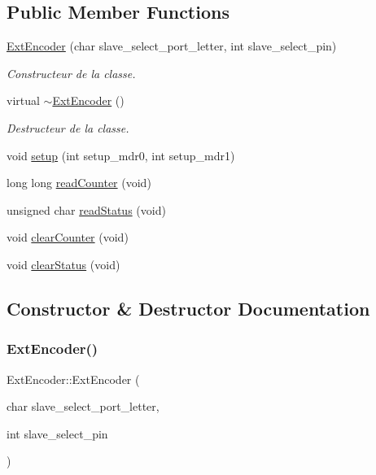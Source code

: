 \subsection*{Public Member Functions}
\begin{DoxyCompactItemize}
\item 
\hyperlink{classExtEncoder_afed10e9b123ac4ce2476cd5cbb7348b1}{Ext\+Encoder} (char slave\+\_\+select\+\_\+port\+\_\+letter, int slave\+\_\+select\+\_\+pin)
\begin{DoxyCompactList}\small\item\em Constructeur de la classe. \end{DoxyCompactList}\item 
\mbox{\label{classExtEncoder_a50afe81cb3a17a6e1caac3170a9ac794}} 
virtual \hyperlink{classExtEncoder_a50afe81cb3a17a6e1caac3170a9ac794}{$\sim$\+Ext\+Encoder} ()
\begin{DoxyCompactList}\small\item\em Destructeur de la classe. \end{DoxyCompactList}\item 
void \hyperlink{classExtEncoder_ac199458c972f5fb241cedc0941ab3a95}{setup} (int setup\+\_\+mdr0, int setup\+\_\+mdr1)
\item 
long long \hyperlink{classExtEncoder_a3ae8c304bba659d47395ba10187bb922}{read\+Counter} (void)
\item 
unsigned char \hyperlink{classExtEncoder_a360d4cc96d0d348082a6e4ab0db59015}{read\+Status} (void)
\item 
void \hyperlink{classExtEncoder_a187873c6764201d81e390898561453b0}{clear\+Counter} (void)
\item 
void \hyperlink{classExtEncoder_a29f9713ba37b80c683e65f07f3d1d122}{clear\+Status} (void)
\end{DoxyCompactItemize}


\subsection{Constructor \& Destructor Documentation}
\mbox{\label{classExtEncoder_afed10e9b123ac4ce2476cd5cbb7348b1}} 
\subsubsection{\texorpdfstring{Ext\+Encoder()}{ExtEncoder()}}
{\footnotesize\ttfamily Ext\+Encoder\+::\+Ext\+Encoder (\begin{DoxyParamCaption}\item[{char}]{slave\+\_\+select\+\_\+port\+\_\+letter,  }\item[{int}]{slave\+\_\+select\+\_\+pin }\end{DoxyParamCaption})}



